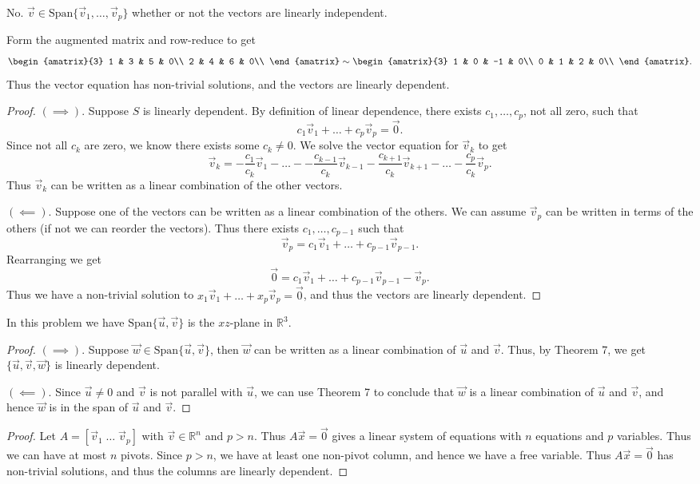 \documentclass[12pt,letterpaper]{article}
\begin{document}
\begin{enumerate}
\Answer No. $\vec{v} \in \text{Span}\{ \vec{v}_1, \dots, \vec{v}_p \}$ whether or not the vectors are linearly independent.

\Answer Form the augmented matrix and row-reduce to get 
  $$\begin{amatrix}{3}
1 & 3 & 5 & 0\\
2 & 4 & 6 & 0\\
\end{amatrix}\sim
\begin{amatrix}{3}
1 & 0 & -1 & 0\\
0 & 1 & 2 & 0\\  
\end{amatrix}.$$
Thus the vector equation has non-trivial solutions, and the vectors are linearly dependent. 
\Answer
\begin{proof}
$(\implies)$. Suppose $S$ is linearly dependent. By definition of linear dependence, there exists $c_1,\dots, c_p$, not all zero, such that $$c_1\vec{v}_1+\dots+ c_p \vec{v}_p =\vec{0}.$$ Since not all $c_k$ are zero, we know there exists some $c_k\neq0$. We solve the vector equation for $\vec{v}_k$ to get $$\vec{v}_k=-\frac{c_1}{c_k}\vec{v}_1-\dots--\frac{c_{k-1}}{c_k}\vec{v}_{k-1}-\frac{c_{k+1}}{c_k}\vec{v}_{k+1}-\dots -\frac{c_p}{c_k}\vec{v}_p.$$ Thus $\vec{v}_k$ can be written as a linear combination of the other vectors.

$(\impliedby)$. Suppose one of the vectors can be written as a linear combination of the others. We can assume $\vec{v}_p$ can be written in terms of the others (if not we can reorder the vectors). Thus there exists $c_1,\dots, c_{p-1}$ such that $$\vec{v}_p=c_1 \vec{v}_1 +\dots+ c_{p-1} \vec{v}_{p-1}.$$ Rearranging we get $$\vec{0}=c_1 \vec{v}_1 +\dots+ c_{p-1} \vec{v}_{p-1}-\vec{v}_p.$$ Thus we have a non-trivial solution to $x_1 \vec{v}_1 +\dots+ x_{p} \vec{v}_{p}=\vec{0}$, and thus the vectors are linearly dependent.
\end{proof}

\Answer 
\Part In this problem we have $\text{Span}\{\vec{u}, \vec{v}\}$ is the $xz$-plane in $\mathbb{R}^3$.
\Part 
\begin{proof}
$(\implies)$. Suppose $\vec{w} \in \text{Span}\{ \vec{u}, \vec{v}\}$, then $\vec{w}$ can be written as a linear combination of $\vec{u}$ and $\vec{v}$. Thus, by Theorem 7, we get $\{\vec{u},\vec{v},\vec{w}\}$ is linearly dependent.

$(\impliedby)$. Since $\vec{u}\neq 0$ and $\vec{v}$ is not parallel with $\vec{u}$, we can use Theorem 7 to conclude that $\vec{w}$ is a linear combination of $\vec{u}$ and $\vec{v}$, and hence $\vec{w}$ is in the span of $\vec{u}$ and $\vec{v}$.
\end{proof}
\Answer
\begin{proof}
Let $A=[\vec{v}_1 \; \dots \; \vec{v}_p]$ with $\vec{v}\in \mathbb{R}^n$ and $p>n$. Thus $A\vec{x}=\vec{0}$ gives a linear system of equations with $n$ equations and $p$ variables. Thus we can have at most $n$ pivots. Since $p>n$, we have at least one non-pivot column, and hence we have a free variable. Thus $A\vec{x}=\vec{0}$ has non-trivial solutions, and thus the columns are linearly dependent. 
\end{proof}
\end{enumerate}
\end{document}
